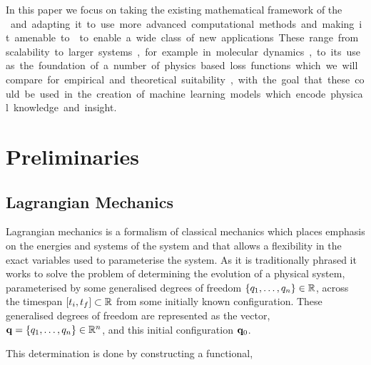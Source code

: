 In this paper we focus on taking the existing mathematical framework of the \SI{} and adapting it to use more advanced computational methods and making it amenable to \autodiff{} to enable a wide class of new applications. These range from scalability to larger systems, for example in molecular dynamics, to its use as the foundation of a number of physics based loss functions which we will compare for empirical and theoretical suitability, with the goal that these could be used in the creation of machine learning models which encode physical knowledge and insight.


\section{Preliminaries}

\subsection{Lagrangian Mechanics}
\label{sec:lag-mech}

Lagrangian mechanics is a formalism of classical mechanics which places emphasis on the energies and systems of the system and that allows a flexibility in the exact variables used to parameterise the system. As it is traditionally phrased it works to solve the problem of determining the evolution of a physical system, parameterised by some generalised degrees of freedom $\left\{q_1, \dots, q_n\right\} \in \mathbb{R}$, across the timespan $[t_i, t_f] \subset \mathbb{R}$ from some initially known configuration. These generalised degrees of freedom are represented as the vector, $\vb q = \left\{q_1, \dots, q_n\right\} \in \mathbb{R}^n$, and this initial configuration $\vb q_0$.

This determination is done by constructing a functional,

